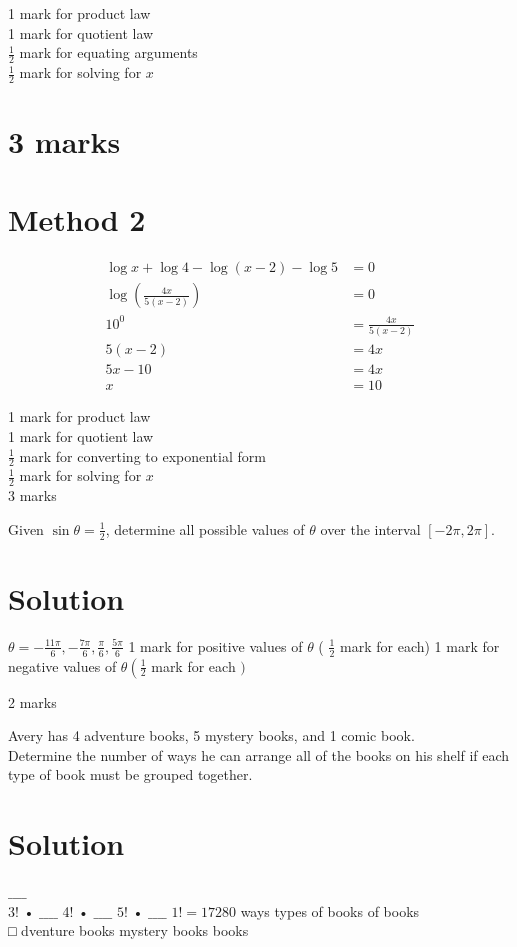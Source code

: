 \documentclass[10pt]{article}
\begin{document}
1 mark for product law\\
1 mark for quotient law\\
$\frac{1}{2}$ mark for equating arguments\\
$\frac{1}{2}$ mark for solving for $x$

\section*{3 marks}
\section*{Method 2}
$$
\begin{aligned}
\log x+\log 4-\log (x-2)-\log 5 & =0 \\
\log \left(\frac{4 x}{5(x-2)}\right) & =0 \\
10^{0} & =\frac{4 x}{5(x-2)} \\
5(x-2) & =4 x \\
5 x-10 & =4 x \\
x & =10
\end{aligned}
$$

1 mark for product law\\
1 mark for quotient law\\
$\frac{1}{2}$ mark for converting to exponential form\\
$\frac{1}{2}$ mark for solving for $x$\\
3 marks

Given $\sin \theta=\frac{1}{2}$, determine all possible values of $\theta$ over the interval $[-2 \pi, 2 \pi]$.

\section*{Solution}
$\theta=-\frac{11 \pi}{6},-\frac{7 \pi}{6}, \frac{\pi}{6}, \frac{5 \pi}{6}$ 1 mark for positive values of $\theta$ ( $\frac{1}{2}$ mark for each) 1 mark for negative values of $\theta\left(\frac{1}{2}\right.$ mark for each $)$

2 marks

Avery has 4 adventure books, 5 mystery books, and 1 comic book.\\
Determine the number of ways he can arrange all of the books on his shelf if each type of book must be grouped together.

\section*{Solution}
$\_\_\_\_$\\
3! • $\_\_\_\_$ 4! • $\_\_\_\_$ $5!$ • $\_\_\_\_$ $1! =17280$ ways types of books of books\\
□ dventure books mystery books books
\end{document}
